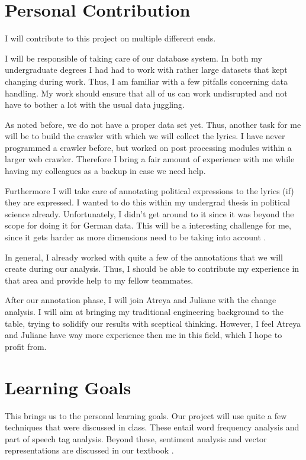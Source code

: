 \documentclass[11pt,a4paper]{article}
\begin{document}
\thispagestyle{plain}
\section*{Personal Contribution}

I will contribute to this project on multiple different ends. 

I will be responsible of taking care of our database system. In both my undergraduate degrees I had had to work with rather large datasets that kept changing during work. Thus, I am familiar with a few pitfalls concerning data handling. My work should ensure that all of us can work undisrupted and not have to bother a lot with the usual data juggling. 

As noted before, we do not have a proper data set yet. Thus, another task for me will be to build the crawler with which we will collect the lyrics. I have never programmed a crawler before, but worked on post processing modules within a larger web crawler. Therefore I bring a fair amount of experience with me while having my colleagues as a backup in case we need help.

Furthermore I will take care of annotating political expressions to the lyrics (if) they are expressed. I wanted to do this within my undergrad thesis in political science already. Unfortunately, I didn't get around to it since it was beyond the scope for doing it for German data. This will be a interesting challenge for me, since it gets harder as more dimensions need to be taking into account \cite{cohen_classifying_2013}. 

In general, I already worked with quite a few of the annotations that we will create during our analysis. Thus, I should be able to contribute my experience in that area and provide help to my fellow teammates. 

After our annotation phase, I will join Atreya and Juliane with the change analysis. I will aim at bringing my traditional engineering background to the table, trying to solidify our results with sceptical thinking. However, I feel Atreya and Juliane have way more experience then me in this field, which I hope to profit from.

\section*{Learning Goals}

This brings us to the personal learning goals.
Our project will use quite a few techniques that were discussed in class. These entail word frequency analysis and part of speech tag analysis. Beyond these, sentiment analysis and vector representations are discussed in our textbook \cite{jurafsky2014speech}. 
\end{document}
